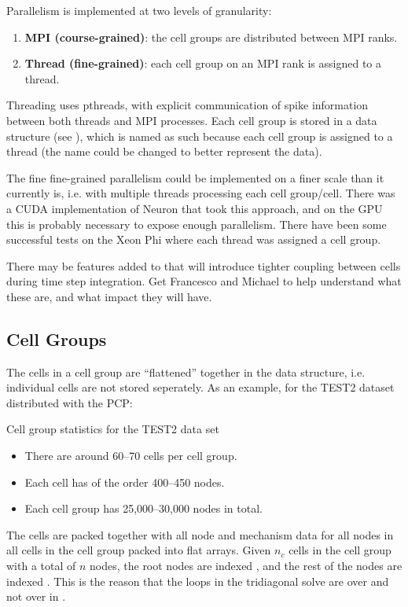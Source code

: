 Parallelism is implemented at two levels of granularity:
\begin{enumerate}
\item
    \textbf{MPI (course-grained)}: the cell groups are distributed between MPI ranks.
\item
    \textbf{Thread (fine-grained)}: each cell group on an MPI rank is assigned to a thread.
\end{enumerate}
Threading uses pthreads, with explicit communication of spike information between both threads and MPI processes.
Each cell group is stored in a  data structure (see ), which is named as such because each cell group is assigned to a thread (the name could be changed to better represent the data).

\begin{note}
The fine fine-grained parallelism could be implemented on a finer scale than it currently is, i.e. with multiple threads processing each cell group/cell. There was a CUDA implementation of Neuron that took this approach, and on the GPU this is probably necessary to expose enough parallelism. There have been some successful tests on the Xeon Phi where each thread was assigned a cell group.
\end{note}
\begin{todo}
There may be features added to \neuron that will introduce tighter coupling between cells during time step integration. Get Francesco and Michael to help understand what these are, and what impact they will have.
\end{todo}

\subsection{Cell Groups}
The cells in a cell group are ``flattened'' together in the  data structure, i.e. individual cells are not stored seperately.
As an example, for the TEST2 dataset distributed with the PCP:
\begin{infobox}{Cell group statistics for the TEST2 data set}
\begin{itemize}[leftmargin=*]
\item
    There are around 60--70 cells per cell group.
\item
    Each cell has of the order 400--450 nodes.
\item
    Each cell group has 25,000--30,000 nodes in total.
\end{itemize}
\end{infobox}
    The cells are packed together with all node and mechanism data for all nodes in all cells in the cell group packed into flat arrays.
        Given $n_c$ cells in the cell group with a total of $n$ nodes, the root nodes are indexed \lst{[1:n_c]}, and the rest of the nodes are indexed \lst{[n_c+1:n]}. This is the reason that the loops in the tridiagonal solve are over  and not over  in .

